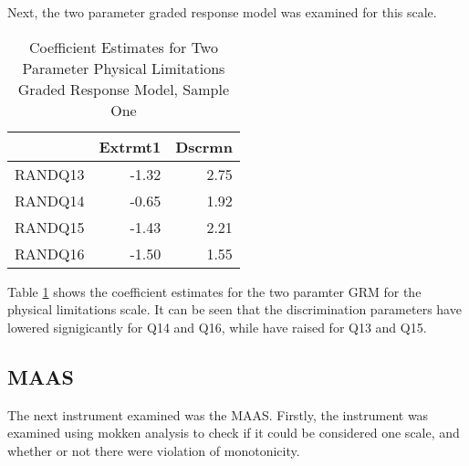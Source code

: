 \documentclass{article}
\begin{document}
Next, the two parameter graded response model was examined for this scale. 

\begin{table}[ht]
\centering
\begin{tabular}{rrr}
  \hline
 & Extrmt1 & Dscrmn \\ 
  \hline
RANDQ13 & -1.32 & 2.75 \\ 
  RANDQ14 & -0.65 & 1.92 \\ 
  RANDQ15 & -1.43 & 2.21 \\ 
  RANDQ16 & -1.50 & 1.55 \\ 
   \hline
\end{tabular}
\caption{Coefficient Estimates for Two Parameter Physical Limitations Graded Response Model, Sample One} 
\label{tab:hom1physlimgrm2pl}
\end{table}

Table \ref{tab:hom1physlimgrm2pl} shows the coefficient estimates for the two paramter GRM for the physical limitations scale. It can be seen that the discrimination parameters have lowered signigicantly for Q14 and Q16, while have raised for Q13 and Q15. 

\subsection{MAAS}
\label{sec:maas}



The next instrument examined was the MAAS.  Firstly, the instrument was examined using mokken analysis to check if it could be considered one scale, and whether or not there were violation of monotonicity.
\end{document}
